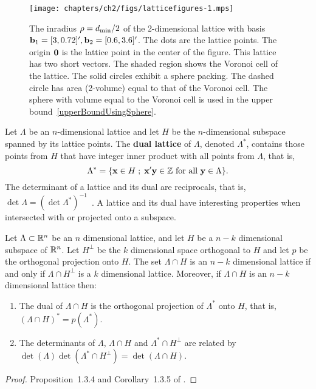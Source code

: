 \begin{figure}[t]
\begin{center}   
\texttt{[image: chapters/ch2/figs/latticefigures-1.mps]}
\caption{The inradius $\rho = d_{\text{min}}/2$ of the 2-dimensional lattice with basis $\mathbf{b}_1 = [3,0.72]^\prime, \mathbf{b}_2 = [0.6,3.6]^\prime$. The dots are the lattice points.  The origin $\boldsymbol{0}$ is the lattice point in the center of the figure.  This lattice has two short vectors.  The shaded region shows the Voronoi cell of the lattice.  The solid circles exhibit a sphere packing.  The dashed circle has area (2-volume) equal to that of the Voronoi cell. The sphere with volume equal to the Voronoi cell is used in the upper bound~\ref{upperBoundUsingSphere}.}
\label{fig:bound_dmin}
\end{center}  
\end{figure} 


Let $\Lambda$ be an $n$-dimensional lattice and let $H$ be the $n$-dimensional subspace spanned by its lattice points. The \textbf{dual lattice} of $\Lambda$, denoted $\Lambda^*$, contains those points from $H$ that have integer inner product with all points from $\Lambda$, that is,
\[
\Lambda^* = \{ \mathbf{x}  \in H \; ; \; \mathbf{x}^\prime \mathbf{y} \in {\mathbb Z} \text{ for all } \mathbf{y} \in \Lambda \}.
\]
The determinant of a lattice and its dual are reciprocals, that is, $\det\Lambda = (\det\Lambda^*)^{-1}$~\cite[p. 10]{SPLAG}.  A lattice and its dual have interesting properties when intersected with or projected onto a subspace.  %

\begin{proposition} \label{prop:ch2-projectedintersection}
Let $\Lambda\subset{\mathbb R}^n$ be an $n$ dimensional lattice, and let $H$ be a $n-k$ dimensional subspace of ${\mathbb R}^n$.  Let $H^\perp$ be the $k$ dimensional space orthogonal to $H$ and let $p$ be the orthogonal projection onto $H$.  The set $\Lambda \cap H$ is an $n-k$ dimensional lattice if and only if $\Lambda \cap H^\perp$ is a $k$ dimensional lattice.  Moreover, if $\Lambda \cap H$ is an $n-k$ dimensional lattice then:
\begin{enumerate}
\item The dual of $\Lambda \cap H$ is the orthogonal projection of $\Lambda^*$ onto $H$, that is, $(\Lambda \cap H)^* = p(\Lambda^*)$.
\item The determinants of $\Lambda$, $\Lambda \cap H$ and $\Lambda^* \cap H^{\perp}$ are related by $\det(\Lambda) \det(\Lambda^* \cap H^{\perp}) = \operatorname{det}(\Lambda \cap H)$.
\end{enumerate}
\end{proposition}
\begin{proof}
Proposition~1.3.4 and Corollary~1.3.5 of \cite{Martinet2003}.
\end{proof}

